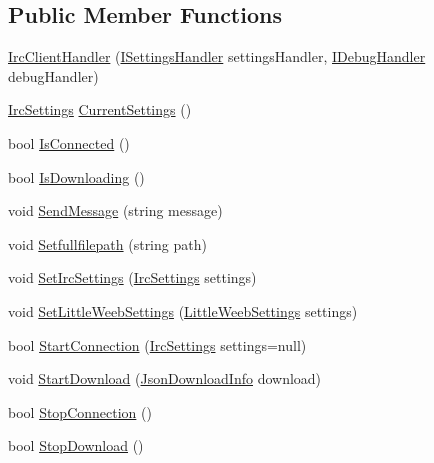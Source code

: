 \subsection*{Public Member Functions}
\begin{DoxyCompactItemize}
\item 
\mbox{\hyperlink{class_little_weeb_library_1_1_handlers_1_1_irc_client_handler_a01745667c95f2c3d5c461f708aa13bb8}{Irc\+Client\+Handler}} (\mbox{\hyperlink{interface_little_weeb_library_1_1_handlers_1_1_i_settings_handler}{I\+Settings\+Handler}} settings\+Handler, \mbox{\hyperlink{interface_little_weeb_library_1_1_handlers_1_1_i_debug_handler}{I\+Debug\+Handler}} debug\+Handler)
\item 
\mbox{\hyperlink{class_little_weeb_library_1_1_settings_1_1_irc_settings}{Irc\+Settings}} \mbox{\hyperlink{class_little_weeb_library_1_1_handlers_1_1_irc_client_handler_aa15fe2f3c1bd99a513400b0880298edd}{Current\+Settings}} ()
\item 
bool \mbox{\hyperlink{class_little_weeb_library_1_1_handlers_1_1_irc_client_handler_a2cc2c26c57a1c94f209ca8641c9e25ef}{Is\+Connected}} ()
\item 
bool \mbox{\hyperlink{class_little_weeb_library_1_1_handlers_1_1_irc_client_handler_a093409b2b1397a6a061e00802546c87b}{Is\+Downloading}} ()
\item 
void \mbox{\hyperlink{class_little_weeb_library_1_1_handlers_1_1_irc_client_handler_ae28984176dff0eda63604b8e5c25abb4}{Send\+Message}} (string message)
\item 
void \mbox{\hyperlink{class_little_weeb_library_1_1_handlers_1_1_irc_client_handler_aafe7e3669d3fdd8a0a3c37a240b3c574}{Setfullfilepath}} (string path)
\item 
void \mbox{\hyperlink{class_little_weeb_library_1_1_handlers_1_1_irc_client_handler_a510c909225e51c66b65f7114ebd356d3}{Set\+Irc\+Settings}} (\mbox{\hyperlink{class_little_weeb_library_1_1_settings_1_1_irc_settings}{Irc\+Settings}} settings)
\item 
void \mbox{\hyperlink{class_little_weeb_library_1_1_handlers_1_1_irc_client_handler_ae0b7e9fc2b6c7874a6be2a938f88fc1a}{Set\+Little\+Weeb\+Settings}} (\mbox{\hyperlink{class_little_weeb_library_1_1_settings_1_1_little_weeb_settings}{Little\+Weeb\+Settings}} settings)
\item 
bool \mbox{\hyperlink{class_little_weeb_library_1_1_handlers_1_1_irc_client_handler_ae463832b8e9aea73f26ed6188a14d92e}{Start\+Connection}} (\mbox{\hyperlink{class_little_weeb_library_1_1_settings_1_1_irc_settings}{Irc\+Settings}} settings=null)
\item 
void \mbox{\hyperlink{class_little_weeb_library_1_1_handlers_1_1_irc_client_handler_afa3e3e60cc12d3867d3c6e2a188dca14}{Start\+Download}} (\mbox{\hyperlink{class_little_weeb_library_1_1_models_1_1_json_download_info}{Json\+Download\+Info}} download)
\item 
bool \mbox{\hyperlink{class_little_weeb_library_1_1_handlers_1_1_irc_client_handler_a97a617b50a161906a91ce1ea483a1770}{Stop\+Connection}} ()
\item 
bool \mbox{\hyperlink{class_little_weeb_library_1_1_handlers_1_1_irc_client_handler_a265ca021f5086addf758e87f59a0aa11}{Stop\+Download}} ()
\end{DoxyCompactItemize}
